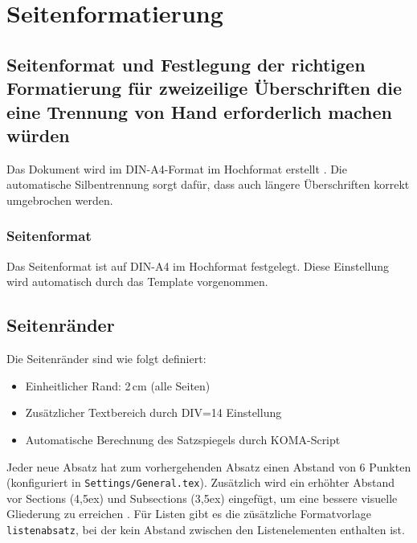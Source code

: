 
\chapter{Seitenformatierung}
\label{chap:seitenformatierung}

\section{Seitenformat und Festlegung der richtigen Formatierung für zweizeilige Überschriften die eine Trennung von Hand erforderlich machen würden}
\label{sec:seitenformat}

Das Dokument wird im DIN-A4-Format im Hochformat erstellt \parencite{hahner2011}. Die automatische Silbentrennung sorgt dafür, dass auch längere Überschriften korrekt umgebrochen werden.

\subsection*{Seitenformat}
\label{subsec:seitenformat_detail}

Das Seitenformat ist auf DIN-A4 im Hochformat festgelegt. Diese Einstellung wird automatisch durch das Template vorgenommen.

\section{Seitenränder}
\label{sec:seitenraender}

Die Seitenränder sind wie folgt definiert:
\begin{itemize}
	\item Einheitlicher Rand: 2\,cm (alle Seiten)
	\item Zusätzlicher Textbereich durch DIV=14 Einstellung
	\item Automatische Berechnung des Satzspiegels durch KOMA-Script
\end{itemize}

Jeder neue Absatz hat zum vorhergehenden Absatz einen Abstand von 6 Punkten (konfiguriert in \texttt{Settings/General.tex}). Zusätzlich wird ein erhöhter Abstand vor Sections (4,5ex) und Subsections (3,5ex) eingefügt, um eine bessere visuelle Gliederung zu erreichen \parencite{theisen2013}. Für Listen gibt es die züsätzliche Formatvorlage \texttt{listenabsatz}, bei der kein Abstand zwischen den Listenelementen enthalten ist.

